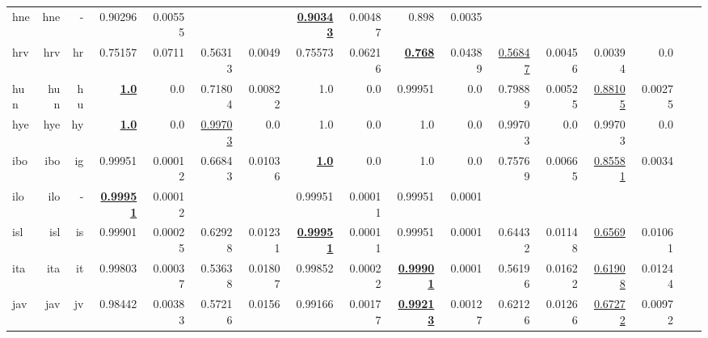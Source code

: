 \documentclass[11pt]{article}
\begin{document}
\begin{table*}[h]
{\begin{tabular}{lrrrrrrrrrrrrrrrr}
hne         & hne         & -         & 0.90296         & 0.00555         &          &          & \textbf{\underline{0.90343}}         & 0.00487         & 0.898         & 0.0035         &          &          &          &          \\
hrv         & hrv         & hr         & 0.75157         & 0.0711         & 0.56313         & 0.0049         & 0.75573         & 0.06216         & \textbf{\underline{0.768}}         & 0.04389         & \underline{0.56847}         & 0.00456         & 0.00394         & 0.0         \\
hun         & hun         & hu         & \textbf{\underline{1.0}}         & 0.0         & 0.71804         & 0.00822         & 1.0         & 0.0         & 0.99951         & 0.0         & 0.79889         & 0.00525         & \underline{0.88105}         & 0.00275         \\
hye         & hye         & hy         & \textbf{\underline{1.0}}         & 0.0         & \underline{0.99703}         & 0.0         & 1.0         & 0.0         & 1.0         & 0.0         & 0.99703         & 0.0         & 0.99703         & 0.0         \\
ibo         & ibo         & ig         & 0.99951         & 0.00012         & 0.66843         & 0.01036         & \textbf{\underline{1.0}}         & 0.0         & 1.0         & 0.0         & 0.75769         & 0.00665         & \underline{0.85581}         & 0.0034         \\
ilo         & ilo         & -         & \textbf{\underline{0.99951}}         & 0.00012         &          &          & 0.99951         & 0.00011         & 0.99951         & 0.0001         &          &          &          &          \\
isl         & isl         & is         & 0.99901         & 0.00025         & 0.62928         & 0.01231         & \textbf{\underline{0.99951}}         & 0.00011         & 0.99951         & 0.0001         & 0.64432         & 0.01148         & \underline{0.6569}         & 0.01061         \\
ita         & ita         & it         & 0.99803         & 0.00037         & 0.53638         & 0.01807         & 0.99852         & 0.00022         & \textbf{\underline{0.99901}}         & 0.0001         & 0.56196         & 0.01622         & \underline{0.61908}         & 0.01244         \\
jav         & jav         & jv         & 0.98442         & 0.00383         & 0.57216         & 0.0156         & 0.99166         & 0.00177         & \textbf{\underline{0.99213}}         & 0.00127         & 0.62126         & 0.01266         & \underline{0.67272}         & 0.00972         \\

\end{tabular}}
\end{table*}
\end{document}
